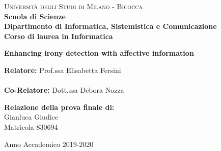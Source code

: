 \documentclass[oneside]{book}
\begin{document}
\begin{titlepage} 
	\noindent
	\begin{minipage}[t]{0.19\textwidth}
	\end{minipage}
	\begin{minipage}[t]{0.81\textwidth}
	{
	{\textsc{Università degli Studi di Milano - Bicocca}} \\
	\textbf{Scuola di Scienze} \\
	\textbf{Dipartimento di Informatica, Sistemistica e Comunicazione} \\
	\textbf{Corso di laurea in Informatica} \\
	\par
	}
	\end{minipage}
	\vspace{40mm}
	
	\begin{center}{\LARGE{\textbf{Enhancing irony detection with affective information}\par}}
	\end{center}        
	\vspace{35mm}
	\noindent
	{\large \textbf{Relatore:} Prof.ssa Elisabetta Fersini} \\\\
	{\large \textbf{Co-Relatore:} Dott.ssa Debora Nozza} \\        
	\vspace{20mm}
	\begin{flushright}
		{\large \textbf{Relazione della prova finale di:}} \\
		\large{Gianluca Giudice} \\
		\large{Matricola 830694} 
	\end{flushright}
	\vspace{20mm}
	\begin{center}
		{\large{Anno Accademico 2019-2020}}
	\end{center}
\end{titlepage}
	
	
\end{document}

